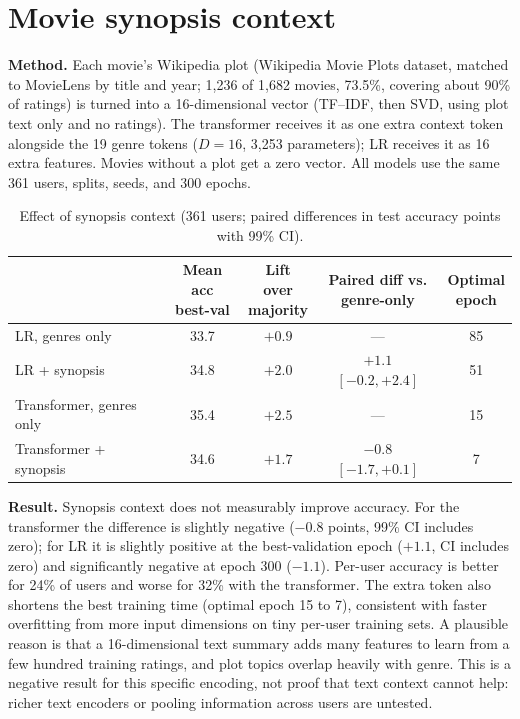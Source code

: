 \documentclass[11pt]{article}
\begin{document}
\section{Movie synopsis context}
\textbf{Method.} Each movie's Wikipedia plot (Wikipedia Movie Plots dataset, matched to MovieLens by title and year; 1{,}236 of
1{,}682 movies, 73.5\%, covering about 90\% of ratings) is turned into a 16-dimensional vector (TF--IDF, then SVD, using plot
text only and no ratings). The transformer receives it as one extra context token alongside the 19 genre tokens ($D=16$,
3{,}253 parameters); LR receives it as 16 extra features. Movies without a plot get a zero vector. All models use the same
361 users, splits, seeds, and 300 epochs.
\begin{table}[h]\centering
\small
\begin{tabular}{lcccc}
\toprule
 & \shortstack{Mean acc\\best-val} & \shortstack{Lift over\\majority} & \shortstack{Paired diff vs.\\genre-only} & \shortstack{Optimal\\epoch} \\
\midrule
LR, genres only & 33.7 & $+0.9$ & --- & 85 \\
LR + synopsis & 34.8 & $+2.0$ & $+1.1$ $[-0.2, +2.4]$ & 51 \\
Transformer, genres only & 35.4 & $+2.5$ & --- & 15 \\
Transformer + synopsis & 34.6 & $+1.7$ & $-0.8$ $[-1.7, +0.1]$ & 7 \\
\bottomrule
\end{tabular}
\caption{Effect of synopsis context (361 users; paired differences in test accuracy points with 99\% CI).}
\end{table}
\textbf{Result.} Synopsis context does not measurably improve accuracy. For the transformer the difference is slightly
negative ($-0.8$ points, 99\% CI includes zero); for LR it is slightly positive at the best-validation epoch ($+1.1$, CI includes zero)
and significantly negative at epoch 300 ($-1.1$). Per-user accuracy is better for 24\% of users and worse for 32\% with the
transformer. The extra token also shortens the best training time (optimal epoch 15 to 7), consistent with faster overfitting from more input
dimensions on tiny per-user training sets. A plausible reason is that a 16-dimensional text summary adds many features to learn from a few hundred training ratings,
and plot topics overlap heavily with genre. This is a negative result for this specific encoding, not proof that
text context cannot help: richer text encoders or pooling information across users are untested.
\end{document}
